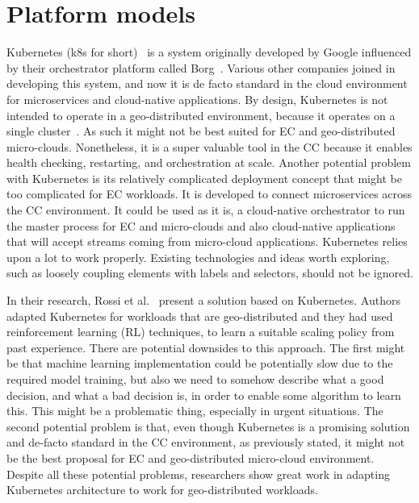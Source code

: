 \section{Platform models}\label{sec:platform_models}
%
Kubernetes (k8s for short)~\cite{BurnsGOBW16} is a system originally developed by Google influenced by their orchestrator platform called Borg~\cite{VermaPKOTW15}. Various other companies joined in developing this system, and now it is de facto standard in the cloud environment for microservices and cloud-native applications. By design, Kubernetes is not intended to operate in a geo-distributed environment, because it operates on a single cluster~\cite{BurnsGOBW16, VermaPKOTW15, RossiCPN20}. As such it might not be best suited for EC and geo-distributed micro-clouds. Nonetheless, it is a super valuable tool in the CC because it enables health checking, restarting, and orchestration at scale. Another potential problem with Kubernetes is its relatively complicated deployment concept that might be too complicated for EC workloads. It is developed to connect microservices across the CC environment. It could be used as it is, a cloud-native orchestrator to run the master process for EC and micro-clouds and also cloud-native applications that will accept streams coming from micro-cloud applications. Kubernetes relies upon a lot to work properly. Existing technologies and ideas worth exploring, such as loosely coupling elements with labels and selectors, should not be ignored.

In their research, Rossi et al.~\cite{RossiCPN20} present a solution based on Kubernetes. Authors adapted Kubernetes for workloads that are geo-distributed and they had used reinforcement learning (RL) techniques, to learn a suitable scaling policy from past experience. There are potential downsides to this approach. The first might be that machine learning implementation could be potentially slow due to the required model training, but also we need to somehow describe what a good decision, and what a bad decision is, in order to enable some algorithm to learn this. This might be a problematic thing, especially in urgent situations. The second potential problem is that, even though Kubernetes is a promising solution and de-facto standard in the CC environment, as previously stated, it might not be the best proposal for EC and geo-distributed micro-cloud environment. Despite all these potential problems, researchers show great work in adapting Kubernetes architecture to work for geo-distributed workloads.

